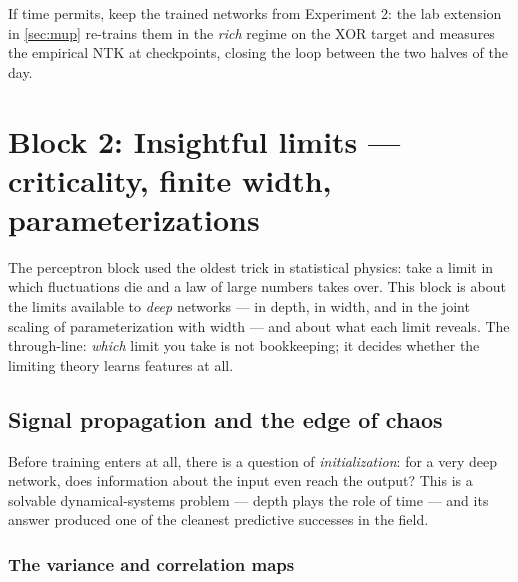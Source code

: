 \documentclass[11pt]{article}
\begin{document}
\begin{callout}[tip]
If time permits, keep the trained networks from Experiment 2: the lab
extension in \cref{sec:mup} re-trains them in the \emph{rich} regime on the
XOR target and measures the empirical NTK at checkpoints, closing the loop
between the two halves of the day.
\end{callout}

\section{Block 2: Insightful limits --- criticality, finite width, parameterizations}
\label{sec:block2}

The perceptron block used the oldest trick in statistical physics: take a
limit in which fluctuations die and a law of large numbers takes over. This
block is about the limits available to \emph{deep} networks --- in depth, in
width, and in the joint scaling of parameterization with width --- and about
what each limit reveals. The through-line: \emph{which} limit you take is
not bookkeeping; it decides whether the limiting theory learns features at
all.

\subsection{Signal propagation and the edge of chaos}
\label{sec:criticality}

Before training enters at all, there is a question of \emph{initialization}:
for a very deep network, does information about the input even reach the
output? This is a solvable dynamical-systems problem --- depth plays the
role of time --- and its answer produced one of the cleanest predictive
successes in the field.

\subsubsection{The variance and correlation maps}
\end{document}
